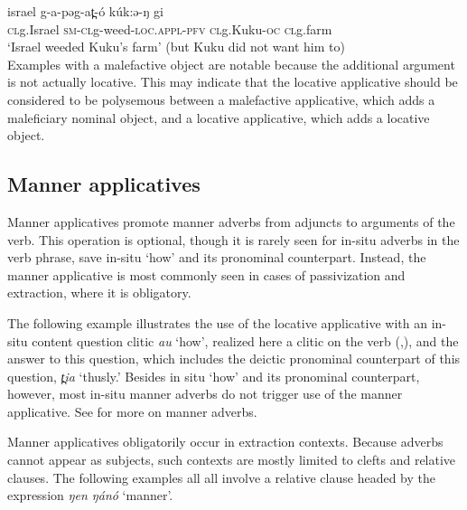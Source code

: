 \ex \gll israel 		g-a-pəg-at̪-ó 			kúk:ə-ŋ 		gi\\
	\textsc{cl}g.Israel	\textsc{sm-cl}g-weed-\textsc{loc.appl-\textsc{pfv}}	\textsc{cl}g.Kuku-\textsc{oc}	\textsc{cl}g.farm\\
	\glt	`Israel weeded Kuku’s farm' (but Kuku did not want him to)\\
\z
\z
Examples with a malefactive object are notable because the additional argument is not actually locative. This may indicate that the locative applicative should be considered to be polysemous between a malefactive applicative, which adds a maleficiary nominal object, and a locative applicative, which adds a locative object.

\subsection{Manner applicatives}\label{sec:ch12:manapplicative}

Manner applicatives promote manner adverbs from adjuncts to arguments of the verb. This operation is optional, though it is rarely seen for in-situ adverbs in the verb phrase, save in-situ `how' and its pronominal counterpart. Instead, the manner applicative is most commonly seen in cases of passivization and extraction, where it is obligatory. 


The following example illustrates the use of the locative applicative with an in-situ content question clitic \textit{au} `how', realized here a clitic on the verb (,), and the answer to this question, which includes the deictic pronominal counterpart of this question, \textit{t̪ia} `thusly.'
\ea   
{}\label{ex:ch11:sweepq}
\z 
\z 
Besides in situ `how' and its pronominal counterpart, however, most in-situ manner adverbs do not trigger use of the manner applicative. See  for more on manner adverbs.

Manner applicatives obligatorily occur in extraction contexts. Because adverbs cannot appear as subjects, such contexts are mostly limited to clefts and relative clauses. The following examples all all involve a relative clause headed by the expression \textit{ŋen ŋánó} `manner'. 

